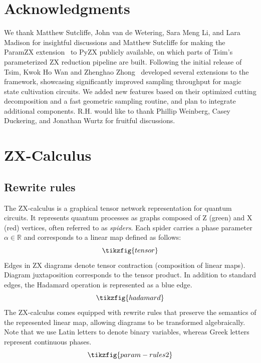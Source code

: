 \documentclass[
  a4paper,
  onecolumn,
  11pt,
  allowtoday
]{quantumarticle}
\newcommand{\todo}[1]{\textcolor{red}{\textbf{TODO:} #1}}
\newcommand{\RR}{\mathbb{R}}
\begin{document}
\section*{Acknowledgments}


We thank Matthew Sutcliffe, John van de Wetering, Sara Meng Li, and Lara Madison for insightful discussions and Matthew Sutcliffe for making the ParamZX extension~\cite{paramzx2024} to PyZX publicly available, on which parts of Tsim's parameterized ZX reduction pipeline are built. Following the initial release of Tsim, Kwok Ho Wan and Zhenghao Zhong~\cite{wan2026simulatingmagicstatecultivation} developed several extensions to the framework, showcasing significantly improved sampling throughput for magic state cultivation circuits. We added new features based on their optimized cutting decomposition and a fast geometric sampling routine, and plan to integrate
additional components. R.H. would like to thank Phillip Weinberg, Casey Duckering, and Jonathan Wurtz  for fruitful discussions.




\onecolumn\newpage
\appendix

\section{ZX-Calculus}
\subsection{Rewrite rules}
\label{sec:zx}

The ZX-calculus is a graphical tensor network representation for quantum circuits. It represents quantum processes as graphs composed of Z (green) and X (red) vertices, often referred to as \emph{spiders}. Each spider carries a phase parameter $\alpha \in \RR$ and corresponds to a linear map defined as follows:
\begin{equation}
  \tikzfig{tensor}
  \label{eqn:tensor_def}
\end{equation}
Edges in ZX diagrams denote tensor contraction (composition of linear maps). Diagram juxtaposition corresponds to the tensor product.
In addition to standard edges, the Hadamard operation is represented as a blue edge.
\begin{equation}
  \tikzfig{hadamard}
  \label{eqn:hadamard}
\end{equation}
The ZX-calculus comes equipped with rewrite rules that preserve the semantics of the represented linear map, allowing diagrams to be transformed algebraically.
Note that we use Latin letters to denote binary variables, whereas Greek letters represent continuous phases.
\begin{equation*}
  \tikzfig{param-rules2}
  \label{eqn:param_rules}
\end{equation*}
\end{document}
